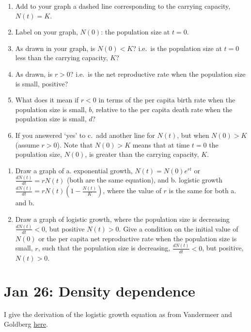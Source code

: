 \documentclass[
]{book}
\providecommand{\tightlist}{%
  \setlength{\itemsep}{0pt}\setlength{\parskip}{0pt}}
\begin{document}
\begin{enumerate}
\def\labelenumi{\alph{enumi}.}
\tightlist
\item
  Add to your graph a dashed line corresponding to the carrying capacity, \(N(t) = K\).
\item
  Label on your graph, \(N(0)\): the population size at \(t=0\).
\item
  As drawn in your graph, is \(N(0)<K\)? i.e.~is the population size at \(t=0\) less than the carrying capacity, \(K\)?
\item
  As drawn, is \(r > 0\)? i.e.~is the net reproductive rate when the population size is small, positive?
\item
  What does it mean if \(r<0\) in terms of the per capita birth rate when the population size is small, \(b\), relative to the per capita death rate when the population size is small, \(d\)?
\item
  If you answered `yes' to c.~add another line for \(N(t)\), but when \(N(0)>K\) (assume \(r>0\)). Note that \(N(0)>K\) means that at time \(t=0\) the population size, \(N(0)\), is greater than the carrying capacity, \(K\).
\end{enumerate}

\begin{enumerate}
\def\labelenumi{\arabic{enumi}.}
\item
  Draw a graph of a. exponential growth, \(N(t) = N(0)e^{rt}\) or \(\frac{dN(t)}{dt} = rN(t)\) (both are the same equation), and b. logistic growth \(\frac{dN(t)}{dt} = rN(t)\left(1 - \frac{N(t)}{K}\right)\), where the value of \(r\) is the same for both a. and b.
\item
  Draw a graph of logistic growth, where the population size is decreasing \(\frac{dN(t)}{dt}<0\), but positive \(N(t)>0\). Give a condition on the initial value of \(N(0)\) or the per capita net reproductive rate when the population size is small, \(r\), such that the population size is decreasing, \(\frac{dN(t)}{dt}<0\), but positive, \(N(t)>0\).
\end{enumerate}

\hypertarget{jan-26-density-dependence}{%
\chapter{Jan 26: Density dependence}\label{jan-26-density-dependence}}

I give the derivation of the logistic growth equation as from Vandermeer and Goldberg \href{https://www.youtube.com/watch?v=UisbkgNlaOE\&t=118s}{here}.
\end{document}
